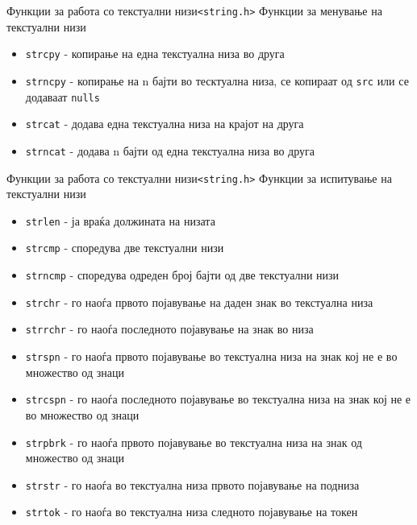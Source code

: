 

\begin{frame}{Функции за работа со текстуални
низи}{\texttt{<string.h>}}
Функции за менување на текстуални низи
\begin{itemize}
  \item \texttt{strcpy} - копирање на една текстуална низа во друга
  \item \texttt{strncpy} - копирање на n бајти во тесктуална низа, се
  копираат од \texttt{src} или се додаваат \texttt{nulls}
  \item \texttt{strcat} - додава една текстуална низа на крајот на друга
  \item \texttt{strncat} - додава n бајти од една текстуална низа во друга
\end{itemize}
\end{frame}

\begin{frame}[shrink=10]{Функции за работа со текстуални
низи}{\texttt{<string.h>}}
Функции за испитување на текстуални низи
\begin{itemize}
  \item \texttt{strlen} - ја враќа должината на низата
  \item \texttt{strcmp} - споредува две текстуални низи
  \item \texttt{strncmp} - споредува одреден број бајти од две текстуални низи
  \item \texttt{strchr} - го наоѓа првото појавување на даден знак во текстуална низа
  \item \texttt{strrchr} - го наоѓа последното појавување на знак во низа
  \item \texttt{strspn} - го наоѓа првото појавување во текстуална низа на знак кој
  не е во множество од знаци
  \item \texttt{strcspn} - го наоѓа последното појавување во текстуална низа на знак кој
  не е во множество од знаци
  \item \texttt{strpbrk} - го наоѓа првото појавување во текстуална низа на знак од
  множество од знаци
  \item \texttt{strstr} - го наоѓа во текстуална низа првото појавување на подниза
  \item \texttt{strtok} - го наоѓа во текстуална низа следното појавување на токен
\end{itemize} 
\end{frame}

